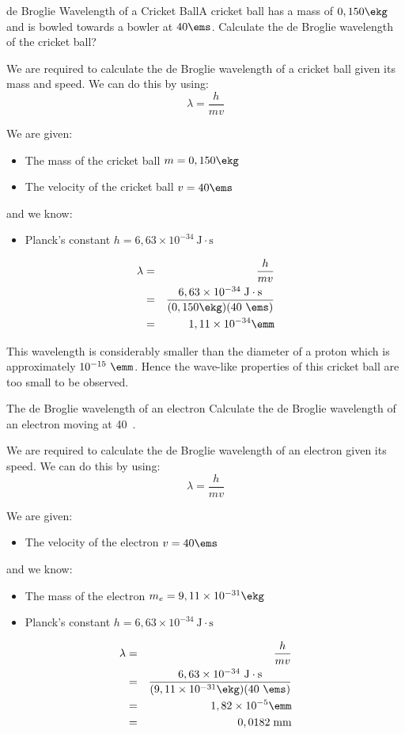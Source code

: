 \begin{wex}{de Broglie Wavelength of a Cricket Ball}{A cricket ball has a mass of $0,150\ekg$ and is bowled towards a bowler at $40\ems$. Calculate the de Broglie wavelength of the cricket ball?}
{
We are required to calculate the de Broglie wavelength of a cricket ball given its mass and speed. We can do this by using:
$$\lambda=\frac{h}{mv}$$

We are given:
\begin{itemize}
\item The mass of the cricket ball $m=0,150\ekg$
\item The velocity of the cricket ball $v=40\ems$
\end{itemize}
and we know:
\begin{itemize}
\item Planck's constant $h=6,63\times 10^{-34}~\mathrm{J\cdot s}$
\end{itemize}

\begin{eqnarray*}
\lambda&=&\frac{h}{mv}\\
&=&\frac{6,63 \times 10^{-34}\;\mathrm{J\cdot s}}{(0,150\ekg)(40~\ems)}\\
&=& 1,11 \times 10^{-34}\emm
\end{eqnarray*}
}
\end{wex}
This wavelength is considerably smaller than the diameter of a proton which is approximately $10^{-15}~\emm$. Hence the wave-like properties of this cricket ball are too small to be  observed.

\begin{wex}{The de Broglie wavelength of an electron}
{Calculate the de Broglie wavelength of an electron moving at 40~\ms.}
{
We are required to calculate the de Broglie wavelength of an electron given its speed. We can do this by using:
$$\lambda=\frac{h}{mv}$$

We are given:
\begin{itemize}
\item The velocity of the electron {$v=40\ems$}
\end{itemize}
and we know:
\begin{itemize}
\item The mass of the electron {$m_{e}=9,11 \times 10^{-31}\ekg$}
\item Planck's constant {$h=6,63 \times 10^{-34}~\mathrm{J\cdot s}$}
\end{itemize}

\begin{eqnarray*}
\lambda&=&\frac{h}{mv}\\
&=&\frac{6,63\times10^{-34}~\mathrm{J\cdot s}}{(9,11 \times 10^{-31}\ekg)(40~\ems)}\\
& = & 1,82 \times 10^{-5}\emm\\
&=&0,0182\;\mathrm{mm}
\end{eqnarray*}
}
\end{wex}


